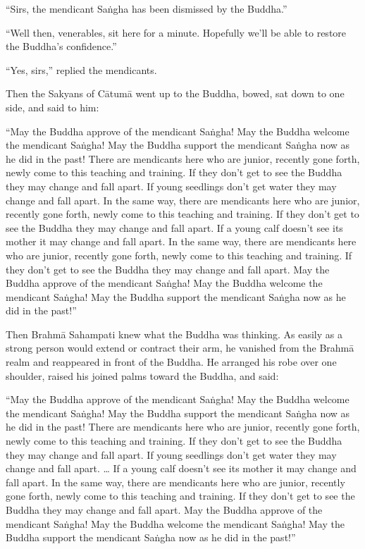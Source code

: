 \documentclass[12pt,openany]{book}%
\begin{document}
“Sirs, the mendicant \textsanskrit{Saṅgha} has been dismissed by the Buddha.” 

“Well then, venerables, sit here for a minute. Hopefully we’ll be able to restore the Buddha’s confidence.” 

“Yes, sirs,” replied the mendicants. 

Then the Sakyans of \textsanskrit{Cātumā} went up to the Buddha, bowed, sat down to one side, and said to him: 

“May the Buddha approve of the mendicant \textsanskrit{Saṅgha}! May the Buddha welcome the mendicant \textsanskrit{Saṅgha}! May the Buddha support the mendicant \textsanskrit{Saṅgha} now as he did in the past! There are mendicants here who are junior, recently gone forth, newly come to this teaching and training. If they don’t get to see the Buddha they may change and fall apart. If young seedlings don’t get water they may change and fall apart. In the same way, there are mendicants here who are junior, recently gone forth, newly come to this teaching and training. If they don’t get to see the Buddha they may change and fall apart. If a young calf doesn’t see its mother it may change and fall apart. In the same way, there are mendicants here who are junior, recently gone forth, newly come to this teaching and training. If they don’t get to see the Buddha they may change and fall apart. May the Buddha approve of the mendicant \textsanskrit{Saṅgha}! May the Buddha welcome the mendicant \textsanskrit{Saṅgha}! May the Buddha support the mendicant \textsanskrit{Saṅgha} now as he did in the past!” 

Then \textsanskrit{Brahmā} Sahampati knew what the Buddha was thinking. As easily as a strong person would extend or contract their arm, he vanished from the \textsanskrit{Brahmā} realm and reappeared in front of the Buddha. He arranged his robe over one shoulder, raised his joined palms toward the Buddha, and said: 

“May the Buddha approve of the mendicant \textsanskrit{Saṅgha}! May the Buddha welcome the mendicant \textsanskrit{Saṅgha}! May the Buddha support the mendicant \textsanskrit{Saṅgha} now as he did in the past! There are mendicants here who are junior, recently gone forth, newly come to this teaching and training. If they don’t get to see the Buddha they may change and fall apart. If young seedlings don’t get water they may change and fall apart. … If a young calf doesn’t see its mother it may change and fall apart. In the same way, there are mendicants here who are junior, recently gone forth, newly come to this teaching and training. If they don’t get to see the Buddha they may change and fall apart. May the Buddha approve of the mendicant \textsanskrit{Saṅgha}! May the Buddha welcome the mendicant \textsanskrit{Saṅgha}! May the Buddha support the mendicant \textsanskrit{Saṅgha} now as he did in the past!” 
\end{document}
